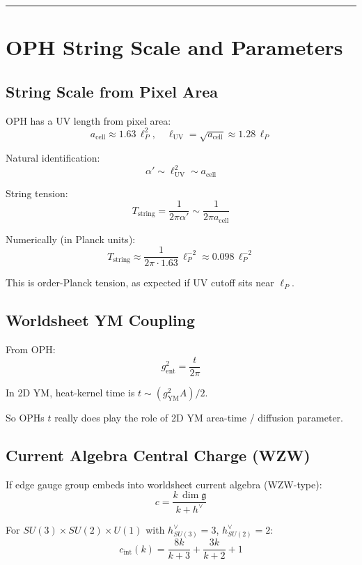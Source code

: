 \begin{center}\rule{0.5\linewidth}{0.5pt}\end{center}

\section{OPH String Scale and Parameters}\label{8-oph-string-scale-and-parameters}

\subsection{String Scale from Pixel Area}\label{81-string-scale-from-pixel-area}

OPH has a UV length from pixel area: \[a_{\text{cell}} \approx 1.63 \, \ell_P^2, \quad \ell_{\text{UV}} = \sqrt{a_{\text{cell}}} \approx 1.28 \, \ell_P\]

Natural identification: \[\alpha' \sim \ell_{\text{UV}}^2 \sim a_{\text{cell}}\]

String tension: \[T_{\text{string}} = \frac{1}{2\pi\alpha'} \sim \frac{1}{2\pi a_{\text{cell}}}\]

Numerically (in Planck units): \[T_{\text{string}} \approx \frac{1}{2\pi \cdot 1.63} \, \ell_P^{-2} \approx 0.098 \, \ell_P^{-2}\]

This is order-Planck tension, as expected if UV cutoff sits near \(\ell_P\).

\subsection{Worldsheet YM Coupling}\label{82-worldsheet-ym-coupling}

From OPH: \[g_{\text{ent}}^2 = \frac{t}{2\pi}\]

In 2D YM, heat-kernel time is \(t \sim (g_{\text{YM}}^2 A)/2\).

So OPH\textquotesingle s \(t\) really does play the role of 2D YM area-time / diffusion parameter.

\subsection{Current Algebra Central Charge (WZW)}\label{83-current-algebra-central-charge-wzw}

If edge gauge group embeds into worldsheet current algebra (WZW-type): \[c = \frac{k \, \dim\mathfrak{g}}{k + h^\vee}\]

For \(SU(3) \times SU(2) \times U(1)\) with \(h^\vee_{SU(3)} = 3\), \(h^\vee_{SU(2)} = 2\): \[c_{\text{int}}(k) = \frac{8k}{k+3} + \frac{3k}{k+2} + 1\]

